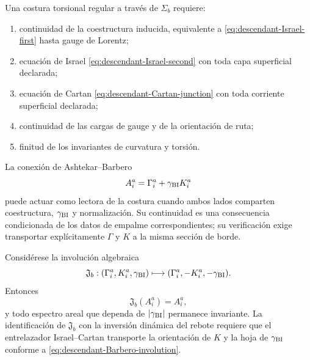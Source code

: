 \begin{criterion}
\label{crit:descendant-Israel-Cartan}
Una costura torsional regular a trav\'es de \(\Sigma_b\) requiere:
\begin{enumerate}[label=\roman*)]
 \item continuidad de la coestructura inducida, equivalente a
       \cref{eq:descendant-Israel-first} hasta gauge de Lorentz;
 \item ecuaci\'on de Israel \cref{eq:descendant-Israel-second} con toda capa
       superficial declarada;
 \item ecuaci\'on de Cartan \cref{eq:descendant-Cartan-junction} con toda
       corriente superficial declarada;
 \item continuidad de las cargas de gauge y de la orientaci\'on de ruta;
 \item finitud de los invariantes de curvatura y torsi\'on.
\end{enumerate}
\end{criterion}

La conexi\'on de Ashtekar--Barbero
\begin{equation}
 A_i^a=\Gamma_i^a+\gamma_{\rm BI}K_i^a
 \label{eq:descendant-Barbero-connection}
\end{equation}
puede actuar como lectora de la costura cuando ambos lados comparten
coestructura, \(\gamma_{\rm BI}\) y normalizaci\'on. Su continuidad es una
consecuencia condicionada de los datos de empalme correspondientes; su
verificaci\'on exige transportar expl\'icitamente \(\Gamma\) y \(K\) a la
misma secci\'on de borde.

\begin{proposition}
\label{prop:descendant-Barbero-involution}
Consid\'erese la involuci\'on algebraica
\begin{equation}
 \mathfrak J_b:
 (\Gamma_i^a,K_i^a,\gamma_{\rm BI})
 \longmapsto
 (\Gamma_i^a,-K_i^a,-\gamma_{\rm BI}).
 \label{eq:descendant-Barbero-involution}
\end{equation}
Entonces
\begin{equation}
 \mathfrak J_b(A_i^a)=A_i^a,
 \label{eq:descendant-Barbero-A-invariant}
\end{equation}
y todo espectro areal que dependa de \(|\gamma_{\rm BI}|\) permanece
invariante. La identificaci\'on de \(\mathfrak J_b\) con la inversi\'on
din\'amica del rebote requiere que el entrelazador Israel--Cartan transporte
la orientaci\'on de \(K\) y la hoja de \(\gamma_{\rm BI}\) conforme a
\cref{eq:descendant-Barbero-involution}.
\end{proposition}

